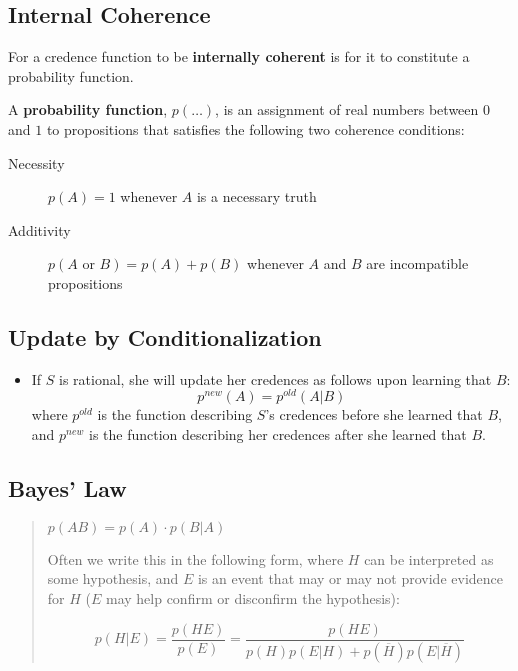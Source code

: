 \documentclass[12pt]{extarticle}
\begin{document}
\subsection{Internal Coherence}

For a credence function to be \textbf{internally coherent} is for it to constitute a probability function.

\vspace{3mm}
\noindent
A \textbf{probability function}, $p(\ldots)$, is an assignment of real numbers between $0$ and $1$ to propositions that satisfies the following two coherence conditions:\label{gloss:prob-fun}
\begin{description}
\item[Necessity]  $p(A) = 1$ whenever $A$ is a necessary truth 

\item [Additivity]  $p(A \text{ or } B) = p(A) + p(B)$ whenever $A$ and $B$ are incompatible propositions

\end{description}


\subsection{Update by Conditionalization}

\begin{itemize}
\item[]
If $S$ is rational, she will update her credences as follows upon learning that $B$:
$$p^{new}(A) = p^{old}(A|B)$$
where  $p^{old}$ is the function describing $S$'s credences before she learned that $B$, and $p^{new}$ is the function describing her credences after she learned that $B$.
\end{itemize}


\subsection{Bayes' Law}


\begin{quote}

$p(AB) = p(A)\cdot p(B|A)$

Often we write this in the following form, where $H$ can be interpreted as some hypothesis, and $E$ is an event that may or may not provide evidence for $H$ ($E$ may help confirm or disconfirm the hypothesis): 

$$p(H|E) = \frac{p(HE)}{p(E)} = \frac{p(HE)}{p(H) p(E|H) + p(\overline{H}) p(E|\overline{H})}$$

\end{quote}
\end{document}
